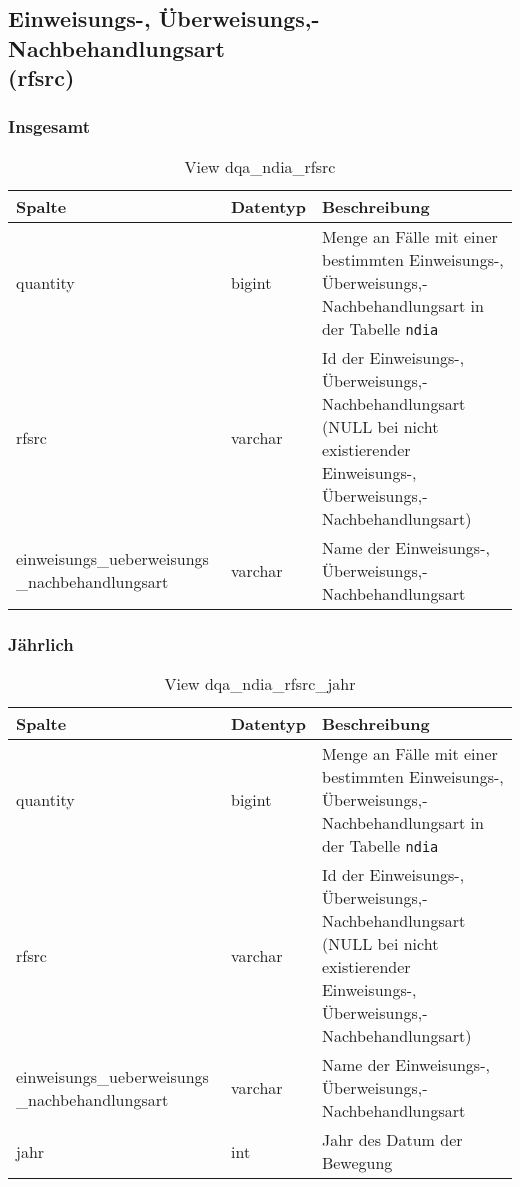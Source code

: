 \subsection{Einweisungs-, Überweisungs,- Nachbehandlungsart \\ (rfsrc)} \label{subsec:bewRfsrc}

\subsubsection{Insgesamt} \label{subsubsec:bewRfsrcI}

\begin{table}[ht]
	\centering   
	\caption{View dqa\_ndia\_rfsrc}
	\label{tab:bewRfsrcI}
	\begin{tabular}{||p{5cm}|l|p{8cm}||}   		
		\hline
		Spalte & Datentyp & Beschreibung \\ [0.5ex]
		\hline\hline
		quantity & bigint & Menge an Fälle mit einer bestimmten Einweisungs-, Überweisungs,- Nachbehandlungsart in der Tabelle \texttt{ndia} \\
		\hline
		rfsrc & varchar & Id der Einweisungs-, Überweisungs,- Nachbehandlungsart (NULL bei nicht existierender Einweisungs-, Überweisungs,- Nachbehandlungsart)\\
		\hline
		einweisungs\_ueberweisungs \_nachbehandlungsart & varchar & Name der Einweisungs-, Überweisungs,- Nachbehandlungsart \\
		\hline
	\end{tabular}
\end{table}

\subsubsection{Jährlich} \label{subsubsec:bewRfsrcJ}

\begin{table}[ht]
	\centering   
	\caption{View dqa\_ndia\_rfsrc\_jahr}
	\label{tab:bewRfsrcJ}
	\begin{tabular}{||p{5cm}|l|p{8cm}||}   		
		\hline
		Spalte & Datentyp & Beschreibung \\ [0.5ex]
		\hline\hline
		quantity & bigint & Menge an Fälle mit einer bestimmten Einweisungs-, Überweisungs,- Nachbehandlungsart in der Tabelle \texttt{ndia}\\
		\hline
		rfsrc & varchar & Id der Einweisungs-, Überweisungs,- Nachbehandlungsart (NULL bei nicht existierender Einweisungs-, Überweisungs,- Nachbehandlungsart)\\
		\hline
		einweisungs\_ueberweisungs \_nachbehandlungsart & varchar & Name der Einweisungs-, Überweisungs,- Nachbehandlungsart \\
		\hline
		jahr & int &  Jahr des Datum der Bewegung \\
		\hline		
	\end{tabular}
\end{table}

